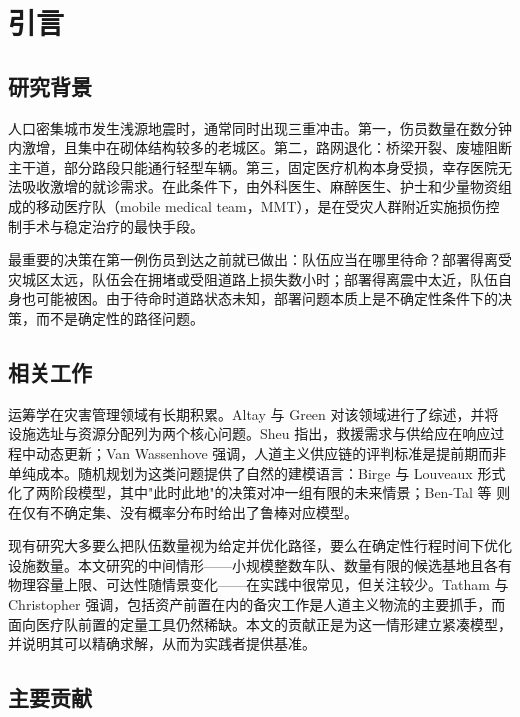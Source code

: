 \documentclass[12pt,a4paper,fontset=windows]{ctexart}
\begin{document}
\newpage
\begingroup
\fontsize{9}{11}\selectfont
\tableofcontents
\endgroup

\newpage

\section{引言}

\subsection{研究背景}

人口密集城市发生浅源地震时，通常同时出现三重冲击。第一，伤员数量在数分钟内激增，且集中在砌体结构较多的老城区。第二，路网退化：桥梁开裂、废墟阻断主干道，部分路段只能通行轻型车辆。第三，固定医疗机构本身受损，幸存医院无法吸收激增的就诊需求。在此条件下，由外科医生、麻醉医生、护士和少量物资组成的移动医疗队（mobile medical team，MMT），是在受灾人群附近实施损伤控制手术与稳定治疗的最快手段。

最重要的决策在第一例伤员到达之前就已做出：队伍应当在哪里待命？部署得离受灾城区太远，队伍会在拥堵或受阻道路上损失数小时；部署得离震中太近，队伍自身也可能被困。由于待命时道路状态未知，部署问题本质上是不确定性条件下的决策，而不是确定性的路径问题。

\subsection{相关工作}

运筹学在灾害管理领域有长期积累。Altay 与 Green \cite{altay2006} 对该领域进行了综述，并将设施选址与资源分配列为两个核心问题。Sheu \cite{sheu2010} 指出，救援需求与供给应在响应过程中动态更新；Van Wassenhove \cite{vanwassenhove2006} 强调，人道主义供应链的评判标准是提前期而非单纯成本。随机规划为这类问题提供了自然的建模语言：Birge 与 Louveaux \cite{birge2011} 形式化了两阶段模型，其中"此时此地"的决策对冲一组有限的未来情景；Ben-Tal 等 \cite{bental2009} 则在仅有不确定集、没有概率分布时给出了鲁棒对应模型。

现有研究大多要么把队伍数量视为给定并优化路径，要么在确定性行程时间下优化设施数量。本文研究的中间情形——小规模整数车队、数量有限的候选基地且各有物理容量上限、可达性随情景变化——在实践中很常见，但关注较少。Tatham 与 Christopher \cite{tatham2014} 强调，包括资产前置在内的备灾工作是人道主义物流的主要抓手，而面向医疗队前置的定量工具仍然稀缺。本文的贡献正是为这一情形建立紧凑模型，并说明其可以精确求解，从而为实践者提供基准。

\subsection{主要贡献}
\end{document}
